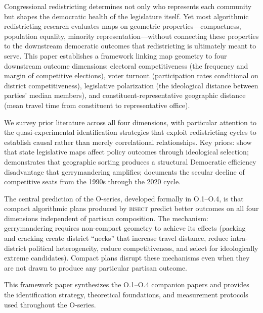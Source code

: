 Congressional redistricting determines not only who represents each community but shapes the
democratic health of the legislature itself. Yet most algorithmic redistricting research evaluates
maps on geometric properties---compactness, population equality, minority representation---without
connecting these properties to the downstream democratic outcomes that redistricting is ultimately
meant to serve. This paper establishes a framework linking map geometry to four downstream outcome
dimensions: electoral competitiveness (the frequency and margin of competitive elections), voter
turnout (participation rates conditional on district competitiveness), legislative polarization
(the ideological distance between parties' median members), and constituent-representative
geographic distance (mean travel time from constituent to representative office).

We survey prior literature across all four dimensions, with particular attention to the
quasi-experimental identification strategies that exploit redistricting cycles to establish
causal rather than merely correlational relationships. Key priors: \citet{caugheyTausanovitch2017}
show that state legislative maps affect policy outcomes through ideological selection;
\citet{rodden2019} demonstrates that geographic sorting produces a structural Democratic
efficiency disadvantage that gerrymandering amplifies; \citet{jacobson2015} documents
the secular decline of competitive seats from the 1990s through the 2020 cycle.

The central prediction of the O-series, developed formally in O.1--O.4, is that compact
algorithmic plans produced by \textsc{bisect} predict better outcomes on all four dimensions
independent of partisan composition. The mechanism: gerrymandering requires non-compact geometry
to achieve its effects (packing and cracking create district ``necks'' that increase travel
distance, reduce intra-district political heterogeneity, reduce competitiveness, and select for
ideologically extreme candidates). Compact plans disrupt these mechanisms even when they are
not drawn to produce any particular partisan outcome.

This framework paper synthesizes the O.1--O.4 companion papers and provides the identification
strategy, theoretical foundations, and measurement protocols used throughout the O-series.
